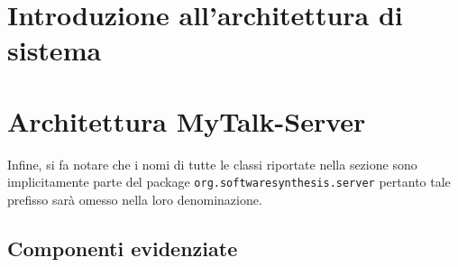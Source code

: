\clearpage
\section{Introduzione all'architettura di sistema}

\clearpage
\section{Architettura MyTalk-Server}
Infine, si fa notare che i nomi di tutte le classi riportate nella sezione sono implicitamente parte del package \texttt{org.softwaresynthesis.server} pertanto tale prefisso sarà omesso nella loro denominazione.

\subsection{Componenti evidenziate}


